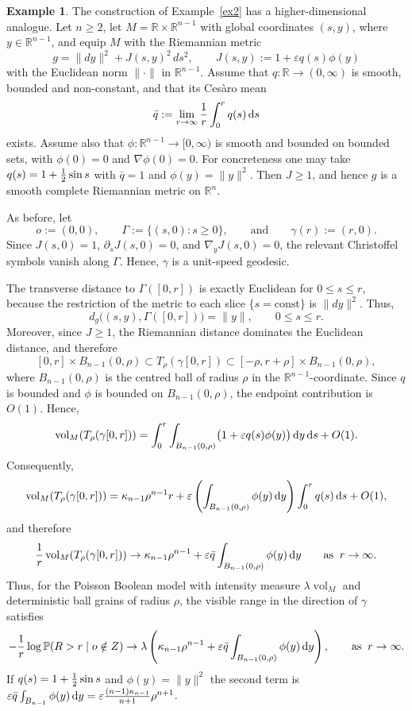 \documentclass[11pt,a4paper]{article}
\theoremstyle{plain}
\theoremstyle{definition}
\newtheorem{example}[theorem]{Example}
\theoremstyle{remark}
\newcommand{\dint}{\textup{d}}
\newcommand{\vol}{\mathop{\mathrm{vol}}\nolimits}
\def\PP{\mathbb{P}}
\def\RR{\mathbb{R}}
\begin{document}
\begin{example}\label{ex3}
	The construction of Example~\ref{ex2} has a higher-dimensional analogue. Let
	\(n\geq2\), let \(M=\RR\times\RR^{n-1}\) with global coordinates \((s,y)\),
	where \(y\in\RR^{n-1}\), and equip \(M\) with the Riemannian metric
	\[
	g=\|dy\|^2+J(s,y)^2\,ds^2,
	\qquad
	J(s,y):=1+\varepsilon q(s)\phi(y)
	\]
	 with the Euclidean norm $\|\cdot\|$ in $\RR^{n-1}$.
	Assume that \(q:\RR\to(0,\infty)\) is smooth, bounded and non-constant, and
	that its Cesàro mean
	\[
	\bar q
	:=
	\lim_{r\to\infty}{1\over r}\int_0^r q(s)\,\dint s
	\]
	exists. 
	Assume also that \(\phi:\RR^{n-1}\to[0,\infty)\) is smooth and bounded
	on bounded sets, with $\phi(0)=0$ and  $\nabla\phi(0)=0$. For concreteness one may take $q(s)=1+{1\over 2}\sin s$ with $\bar q=1$ and $\phi(y)=\|y\|^2$.
	Then \(J\geq1\), and hence \(g\) is a smooth complete Riemannian metric on
	\(\RR^n\).
	
	As before, let
	\[
	o:=(0,0),
	\qquad
	\Gamma:=\{(s,0):s\geq0\},
	\qquad\text{and}\qquad
	\gamma(r):=(r,0).
	\]
	Since \(J(s,0)=1\), \(\partial_sJ(s,0)=0\), and
	\(\nabla_yJ(s,0)=0\), the relevant Christoffel symbols vanish along
	\(\Gamma\). Hence, \(\gamma\) is a unit-speed geodesic.
	
	The transverse distance to \(\Gamma([0,r])\) is exactly Euclidean for
	\(0\leq s\leq r\), because the restriction of the metric to each slice
	\(\{s=\mathrm{const}\}\) is \(\|dy\|^2\). Thus,
	\[
	d_g\bigl((s,y),\Gamma([0,r])\bigr)=\|y\|,
	\qquad 0\leq s\leq r.
	\]
	Moreover, since \(J\geq1\), the Riemannian distance dominates the Euclidean
	distance, and therefore
	\[
	[0,r]\times B_{n-1}(0,\rho)
	\subset
	T_\rho(\gamma[0,r])
	\subset
	[-\rho,r+\rho]\times B_{n-1}(0,\rho),
	\]
	where $B_{n-1}(0,\rho)$ is the centred ball of radius $\rho$ in the $\RR^{n-1}$-coordinate.
	Since \(q\) is bounded and \(\phi\) is bounded on \(B_{n-1}(0,\rho)\), the
	endpoint contribution is \(O(1)\). Hence,
	\[
	\vol_M(T_\rho(\gamma[0,r]))
	=
	\int_0^r\int_{B_{n-1}(0,\rho)}
	\bigl(1+\varepsilon q(s)\phi(y)\bigr)\,\dint y\,\dint s
	+
	O(1).
	\]
	Consequently,
	\[
	\vol_M(T_\rho(\gamma[0,r]))
	=
	\kappa_{n-1}\rho^{n-1}r
	+
	\varepsilon
	\left(\int_{B_{n-1}(0,\rho)}\phi(y)\,\dint y\right)
	\int_0^r q(s)\,\dint s
	+
	O(1),
	\]
	and therefore
	\[
	{1\over r}\vol_M(T_\rho(\gamma[0,r]))
	\to
	\kappa_{n-1}\rho^{n-1}
	+
	\varepsilon\bar q
	\int_{B_{n-1}(0,\rho)}\phi(y)\,\dint y \qquad\text{as}\;\; r\to\infty.
	\]
	Thus, for the Poisson Boolean model with intensity measure
	\(\lambda\vol_M\) and deterministic ball grains of radius $\rho$, the visible range in the direction of \(\gamma\) satisfies
	\[
	-\frac{1}{r}\log \PP(R>r\mid o\notin Z)
	\to
	\lambda\left(
	\kappa_{n-1}\rho^{n-1}
	+
	\varepsilon\bar q
	\int_{B_{n-1}(0,\rho)}\phi(y)\,\dint y
	\right),\qquad\text{as}\;\; r\to\infty.
	\]
	If $q(s)=1+{1\over 2}\sin s$ and $\phi(y)=\|y\|^2$ the second term is $\varepsilon\bar q\int_{B_{n-1}}\phi(y)\,\dint y=\varepsilon{(n-1)\kappa_{n-1}\over n+1}\rho^{n+1}$. 
\end{example}
\end{document}
